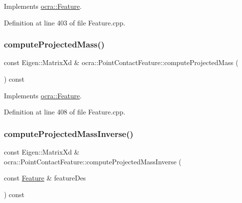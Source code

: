 Implements \hyperlink{classocra_1_1Feature_a44e11dd349e92971fefebff354e7214b}{ocra\+::\+Feature}.



Definition at line 403 of file Feature.\+cpp.

\hypertarget{classocra_1_1PointContactFeature_a04933fcbcc63eee1d7dbf926a0cbca8a}{}\label{classocra_1_1PointContactFeature_a04933fcbcc63eee1d7dbf926a0cbca8a} 
\subsubsection{\texorpdfstring{compute\+Projected\+Mass()}{computeProjectedMass()}\hspace{0.1cm}{\footnotesize\ttfamily [2/2]}}
{\footnotesize\ttfamily const Eigen\+::\+Matrix\+Xd \& ocra\+::\+Point\+Contact\+Feature\+::compute\+Projected\+Mass (\begin{DoxyParamCaption}{ }\end{DoxyParamCaption}) const\hspace{0.3cm}{\ttfamily [virtual]}}



Implements \hyperlink{classocra_1_1Feature_a99ac023809c0cf34b5d582537934b08c}{ocra\+::\+Feature}.



Definition at line 408 of file Feature.\+cpp.

\hypertarget{classocra_1_1PointContactFeature_a5425d1c3dfd4148e7adf6213e80291ba}{}\label{classocra_1_1PointContactFeature_a5425d1c3dfd4148e7adf6213e80291ba} 
\subsubsection{\texorpdfstring{compute\+Projected\+Mass\+Inverse()}{computeProjectedMassInverse()}\hspace{0.1cm}{\footnotesize\ttfamily [1/2]}}
{\footnotesize\ttfamily const Eigen\+::\+Matrix\+Xd \& ocra\+::\+Point\+Contact\+Feature\+::compute\+Projected\+Mass\+Inverse (\begin{DoxyParamCaption}\item[{const \hyperlink{classocra_1_1Feature}{Feature} \&}]{feature\+Des }\end{DoxyParamCaption}) const\hspace{0.3cm}{\ttfamily [virtual]}}




